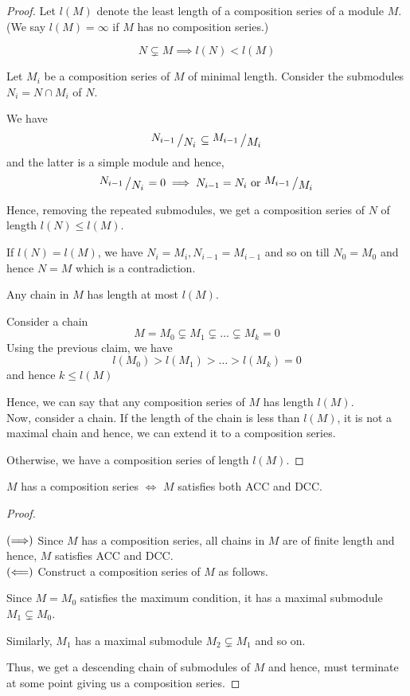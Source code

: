 \begin{proof}
	Let \(l(M)\) denote the least length of a composition series
	of a module \(M\).
	(We say \(l(M) = \infty\) if \(M\) has no composition series.) \\

	\begin{claim}{}{}
		\[
			N \subsetneq M \implies l(N) < l(M)
		\]
	\end{claim}
	Let \(M_i\) be a composition series of \(M\) of minimal length.
	Consider the submodules \(N_i = N \cap M_i\) of \(N\).

	We have
	\[
		\bigslant{N_{i-1}}{N_i} \subseteq \bigslant{M_{i-1}}{M_i}
	\]
	and the latter is a simple module and hence,
	\[
		\bigslant{N_{i-1}}{N_i} = 0 \implies N_{i-1} = N_i
		\OR \bigslant{M_{i-1}}{M_i}
	\]

	Hence, removing the repeated submodules, we get a composition series
	of \(N\) of length \(l(N) \leq l(M) \).

	If \(l(N) = l(M)\), we have \(N_i = M_i, N_{i-1} = M_{i-1}\) and so
	on till \(N_0 = M_0\) and hence \(N = M\) which is a contradiction. \\

	\begin{claim}{}{}
		Any chain in \(M\) has length at most \(l(M)\).
	\end{claim}
	Consider a chain
	\[
		M = M_0 \subsetneq M_1 \subsetneq \dots \subsetneq M_k = 0
	\]
	Using the previous claim, we have
	\[
		l(M_0) > l(M_1) > \dots > l(M_k) = 0
	\]
	and hence \(k \leq l(M)\)

	Hence, we can say that any composition series
	of \(M\) has length \(l(M)\). \\

	Now, consider a chain.
	If the length of the chain is less than \(l(M)\), it is not a maximal
	chain and hence, we can extend it to a composition series.

	Otherwise, we have a composition series of length \(l(M)\).
\end{proof}


\begin{proposition}{}{}
	\(M\) has a composition series \(\iff\) \(M\) satisfies both
	ACC and DCC.\
\end{proposition}

\begin{proof} \

	\(\left( \Longrightarrow \right)\)
	Since \(M\) has a composition series, all chains in \(M\) are
	of finite length and hence, \(M\) satisfies ACC and DCC. \\

	\(\left( \Longleftarrow \right)\)
	Construct a composition series of \(M\) as follows.

	Since \(M = M_0\) satisfies the maximum condition, it has a maximal
	submodule \(M_1 \subsetneq M_0\).

	Similarly, \(M_1\) has a maximal submodule \(M_2 \subsetneq M_1\)
	and so on.

	Thus, we get a descending chain of submodules of \(M\) and hence,
	must terminate at some point giving us a composition series.
\end{proof}


